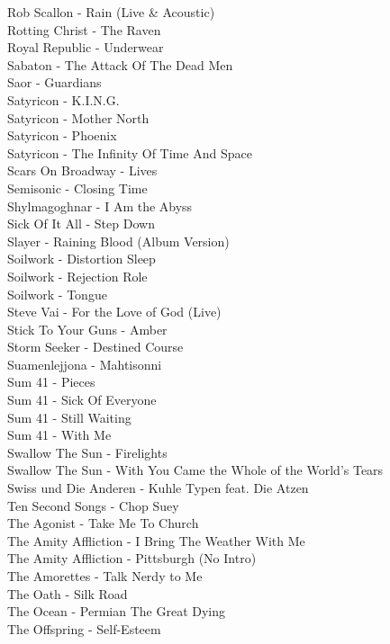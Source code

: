 Rob Scallon - Rain (Live \& Acoustic)\\
Rotting Christ - The Raven\\
Royal Republic - Underwear\\
Sabaton - The Attack Of The Dead Men\\
Saor - Guardians\\
Satyricon - K.I.N.G.\\
Satyricon - Mother North\\
Satyricon - Phoenix\\
Satyricon - The Infinity Of Time And Space\\
Scars On Broadway - Lives\\
Semisonic - Closing Time\\
Shylmagoghnar - I Am the Abyss\\
Sick Of It All - Step Down\\
Slayer - Raining Blood (Album Version)\\
Soilwork - Distortion Sleep\\
Soilwork - Rejection Role\\
Soilwork - Tongue\\
Steve Vai - For the Love of God (Live)\\
Stick To Your Guns - Amber\\
Storm Seeker - Destined Course\\
Suamenlejjona - Mahtisonni\\
Sum 41 - Pieces\\
Sum 41 - Sick Of Everyone\\
Sum 41 - Still Waiting\\
Sum 41 - With Me\\
Swallow The Sun - Firelights\\
Swallow The Sun - With You Came the Whole of the World's Tears\\
Swiss und Die Anderen - Kuhle Typen feat. Die Atzen\\
Ten Second Songs - Chop Suey\\
The Agonist - Take Me To Church\\
The Amity Affliction - I Bring The Weather With Me\\
The Amity Affliction - Pittsburgh (No Intro)\\
The Amorettes - Talk Nerdy to Me\\
The Oath - Silk Road\\
The Ocean - Permian The Great Dying\\
The Offspring - Self-Esteem\\
